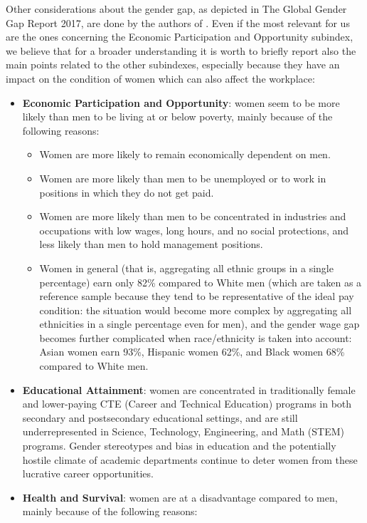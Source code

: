 Other considerations about the gender gap, as depicted in The Global Gender Gap Report 2017, are done by the authors of \cite{hazel2019gender}. Even if the most relevant for us are the ones concerning the Economic Participation and Opportunity subindex, we believe that for a broader understanding it is worth to briefly report also the main points related to the other subindexes, especially because they have an impact on the condition of women which can also affect the workplace:
\begin{itemize}
\item \textbf{Economic Participation and Opportunity}: women seem to be more likely than men to be living at or below poverty, mainly because of the following reasons:
\begin{itemize}
\item Women are more likely to remain economically dependent on men.
\item Women are more likely than men to be unemployed or to work in positions in which they do not get paid.
\item Women are more likely than men to be concentrated in industries and occupations with low wages, long hours, and no social protections, and less likely than men to hold management positions.
\item Women in general (that is, aggregating all ethnic groups in a single percentage) earn only 82\% compared to White men (which are taken as a reference sample because they tend to be representative of the ideal pay condition: the situation would become more complex by aggregating all ethnicities in a single percentage even for men), and the gender wage gap becomes further complicated when race/ethnicity is taken into account: Asian women earn 93\%, Hispanic women 62\%, and Black women 68\% compared to White men.
\end{itemize}
\item \textbf{Educational Attainment}: women are concentrated in traditionally female and lower-paying CTE (Career and Technical Education) programs in both secondary and postsecondary educational settings, and are still underrepresented in Science, Technology, Engineering, and Math (STEM) programs. Gender stereotypes and bias in education and the potentially hostile climate of academic departments continue to deter women from these lucrative career opportunities.
\item \textbf{Health and Survival}: women are at a disadvantage compared to men, mainly because of the following reasons:
\begin{itemize}

\end{itemize}
\end{itemize}
